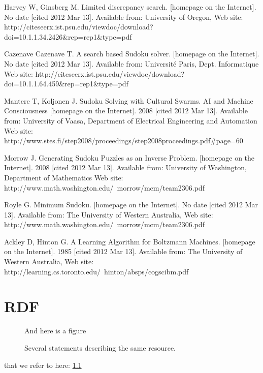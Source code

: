 \documentclass[a4paper,11pt]{kth-mag}
\begin{document}
\begin{thebibliography}{99}
Harvey W, Ginsberg M. Limited discrepancy search. [homepage on the Internet]. No date [cited 2012 Mar 13]. Available from: University of Oregon, Web site: http://citeseerx.ist.psu.edu/viewdoc/download?doi=10.1.1.34.2426\&rep=rep1\&type=pdf

Cazenave Cazenave T. A search based Sudoku solver. [homepage on the Internet]. No date [cited 2012 Mar 13]. Available from: Université Paris, Dept. Informatique Web site: http://citeseerx.ist.psu.edu/viewdoc/download?doi=10.1.1.64.459\&rep=rep1\&type=pdf

Mantere T, Koljonen J. Sudoku Solving with Cultural Swarms. AI and Machine Consciousness [homepage on the Internet]. 2008 [cited 2012 Mar 13]. Available from: University of Vaasa, Department of Electrical Engineering and Automation Web site: http://www.stes.fi/step2008/proceedings/step2008proceedings.pdf\#page=60

Morrow J. Generating Sudoku Puzzles as an Inverse Problem. [homepage on the Internet]. 2008 [cited 2012 Mar 13]. Available from: University of Washington, Department of Mathematics Web site: http://www.math.washington.edu/~morrow/mcm/team2306.pdf

Royle G. Minimum Sudoku. [homepage on the Internet]. No date [cited 2012 Mar 13]. Available from: The University of Western Australia, Web site: http://www.math.washington.edu/~morrow/mcm/team2306.pdf

Ackley D, Hinton G. A Learning Algorithm for Boltzmann Machines. [homepage on the Internet]. 1985 [cited 2012 Mar 13]. Available from: The University of Western Australia, Web site: http://learning.cs.toronto.edu/~hinton/absps/cogscibm.pdf

\end{thebibliography}

\appendix
\addappheadtotoc
\chapter{RDF}\label{appA}

\begin{figure}[ht]
\begin{center}
And here is a figure
\caption{\small{Several statements describing the same resource.}}\label{RDF_4}
\end{center}
\end{figure}

that we refer to here: \ref{RDF_4}
\end{document}
